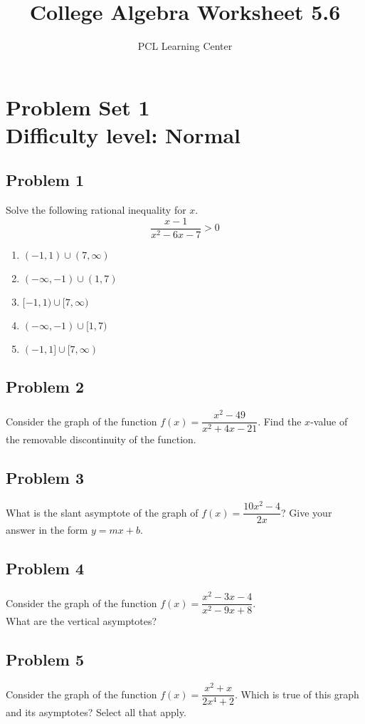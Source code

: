 \documentclass[12pt]{article}
\title{College Algebra Worksheet 5.6}
\author{PCL Learning Center}
\date{}
\begin{document}
\maketitle

\section*{Problem Set 1\\Difficulty level: Normal}
\subsection*{Problem 1}
Solve the following rational inequality for \(x\).
\[\dfrac{x-1}{x^2-6x-7}>0\]
\begin{enumerate}[label=(\alph*)]
    \item $(-1, 1) \cup (7, \infty)$
    \item $(-\infty, -1) \cup (1, 7)$
    \item $[-1, 1) \cup [7, \infty)$
    \item $(-\infty, -1) \cup [1, 7)$
    \item $(-1, 1] \cup [7, \infty)$
\end{enumerate}

\subsection*{Problem 2}
Consider the graph of the function \(f(x)=\dfrac{x^2-49}{x^2+4x-21}\). Find the \(x\)-value of the removable discontinuity of the function.

\subsection*{Problem 3}
What is the slant asymptote of the graph of \(f(x)=\dfrac{10x^2-4}{2x}\)? Give your answer in the form \(y=mx+b\).

\subsection*{Problem 4}
Consider the graph of the function \(f(x)=\dfrac{x^2-3x-4}{x^2-9x+8}\).\\
What are the vertical asymptotes?

\subsection*{Problem 5} Consider the graph of the function \(f(x)=\dfrac{x^2+x}{2x^4+2}\). Which is true of this graph and its asymptotes? Select all that apply.
\end{document}
